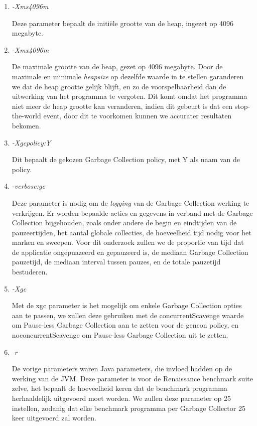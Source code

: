 \begin{enumerate}
    
    \item \textit{-Xms4096m}
    
    Deze parameter bepaalt de initiële grootte van de heap, ingezet op 4096 megabyte.
    
    
    \item \textit{-Xmx4096m}
    
    De maximale grootte van de heap, gezet op 4096 megabyte.
    Door de maximale en minimale \textit{heapsize} op dezelfde waarde in te stellen garanderen we dat de heap grootte gelijk blijft, en zo de voorspelbaarheid dan de uitwerking van het programma te vergoten.
    Dit komt omdat het programma niet meer de heap grootte kan veranderen, indien dit gebeurt is dat een stop-the-world event, door dit te voorkomen kunnen we accurater resultaten bekomen.
   

    \item \textit{-Xgcpolicy:Y}
    
    Dit bepaalt de gekozen Garbage Collection policy, met Y als naam van de policy.
    
    \item \textit{-verbose:gc}
    
    Deze parameter is nodig om de \textit{logging} van de Garbage Collection werking te verkrijgen.
    Er worden bepaalde acties en gegevens in verband met de Garbage Collection bijgehouden, zoals onder andere de begin en eindtijden van de pauzeertijden, het aantal globale collecties, de hoeveelheid tijd nodig voor het marken en sweepen.
    Voor dit onderzoek zullen we de proportie van tijd dat de applicatie ongepuazeerd en gepauzeerd is, de mediaan  Garbage Collection pauzetijd, de mediaan interval tussen pauzes, en de totale pauzetijd bestuderen.
    
    
    \item \textit{-Xgc}
    
    Met de xgc parameter is het mogelijk om enkele Garbage Collection opties aan te passen, we zullen deze gebruiken met de concurrentScavenge waarde om Pause-less Garbage Collection aan te zetten voor de gencon policy, en noconcurrentScavenge om Pause-less Garbage Collection uit te zetten.
    
    
    
    \item \textit{-r}
    
    De vorige parameters waren Java parameters, die invloed hadden op de werking van de JVM.
    Deze parameter is voor de Renaissance benchmark suite zelve, het bepaalt de hoeveelheid keren dat de benchmark programma herhaaldelijk uitgevoerd moet worden.
    We zullen deze parameter op 25 instellen, zodanig dat elke benchmark programma per Garbage Collector 25 keer uitgevoerd zal worden.
    
\end{enumerate}


